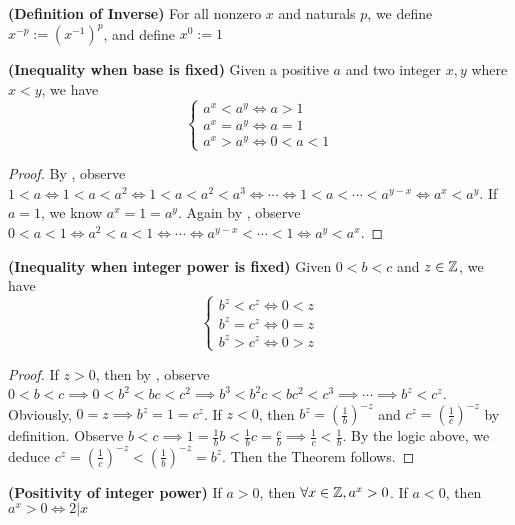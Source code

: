 \documentclass{report}
\begin{document}
\begin{definition}
\label{1.2.8}
\textbf{(Definition of Inverse)} For all nonzero $x$ and naturals $p$, we define $x^{-p}:=(x^{-1})^p$, and define $x^0:=1$ 
\end{definition}
\begin{theorem}
\label{1.2.9}
  
\textbf{(Inequality when base is fixed)} Given a positive $a$ and two integer  $x,y$ where  $x<y$, we have
\begin{equation}
\begin{cases}
  a^x<a^y\iff a>1\\
  a^x=a^y \iff a=1 \\
  a^x>a^y \iff 0<a<1  
\end{cases}
\end{equation}
\end{theorem}
\begin{proof}
By , observe $1<a\iff  1<a<a^2\iff   1<a<a^2<a^3\iff  \cdots  \iff  1<a<\cdots <a^{y-x}\iff  a^x<a^y$. If $a=1$, we know  $a^x=1=a^y$. Again by , observe $0<a<1\iff  a^2<a<1\iff  \cdots \iff  a^{y-x}<\cdots <1\iff  a^{y}<a^{x}$. 
\end{proof}
\begin{theorem}
\label{1.2.10}
\textbf{(Inequality when integer power is fixed)} Given $0<b<c$ and  $z\in\mathbb{Z}$, we have 
\begin{equation}
\begin{cases}
  b^z<c^z \iff 0<z\\
  b^z=c^z \iff 0=z\\
  b^z>c^z\iff 0>z
\end{cases}
\end{equation}
\end{theorem}
\begin{proof}
  If $z>0$, then by , observe $0<b<c\implies 0<b^2<bc<c^2\implies b^3<b^2c<bc^2<c^3\implies \cdots \implies b^z<c^z $. Obviously, $0=z\implies b^z=1=c^z$. If $z<0$, then $b^z=(\frac{1}{b})^{-z}$ and $c^z=(\frac{1}{c})^{-z}$ by definition. Observe $b<c\implies 1=\frac{1}{b}b<\frac{1}{b}c=\frac{c}{b}\implies \frac{1}{c}<\frac{1}{b}$. By the logic above, we deduce $c^z=(\frac{1}{c})^{-z}<(\frac{1}{b})^{-z}=b^z$. Then the Theorem follows. 
\end{proof}
\begin{theorem}
\label{1.2.11}
\textbf{(Positivity of integer power)} If $a>0$, then $\forall x\in\mathbb{Z},a^x>0$. If  $a<0$, then  $a^x>0\iff 2|x$
\end{theorem}
\end{document}
